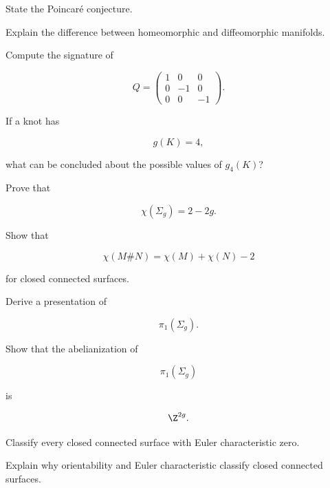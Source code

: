 \begin{exercise}[2]
State the Poincar\'e conjecture.
\end{exercise}

\begin{exercise}[2]
Explain the difference between homeomorphic and diffeomorphic manifolds.
\end{exercise}

\begin{exercise}[2]
Compute the signature of

\[
Q=
\begin{pmatrix}
1&0&0\\
0&-1&0\\
0&0&-1
\end{pmatrix}.
\]
\end{exercise}

\begin{exercise}[2]
If a knot has

\[
g(K)=4,
\]

what can be concluded about the possible values of \(g_4(K)\)?
\end{exercise}

\begin{exercise}[3]
Prove that

\[
\chi(\Sigma_g)=2-2g.
\]
\end{exercise}

\begin{exercise}[3]
Show that

\[
\chi(M\#N)
=
\chi(M)+\chi(N)-2
\]

for closed connected surfaces.
\end{exercise}

\begin{exercise}[3]
Derive a presentation of

\[
\pi_1(\Sigma_g).
\]
\end{exercise}

\begin{exercise}[3]
Show that the abelianization of

\[
\pi_1(\Sigma_g)
\]

is

\[
\Z^{2g}.
\]
\end{exercise}

\begin{exercise}[3]
Classify every closed connected surface with Euler characteristic zero.
\end{exercise}

\begin{exercise}[3]
Explain why orientability and Euler characteristic classify closed connected
surfaces.
\end{exercise}

